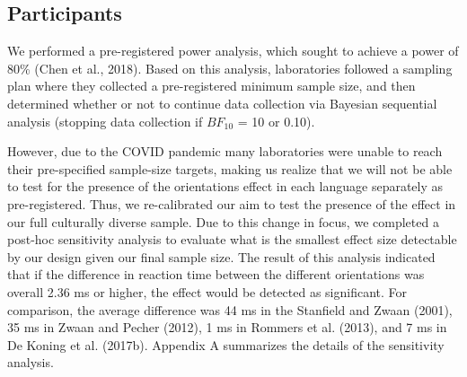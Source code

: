 \documentclass[
  man,mask,floatsintext]{apa7}
\begin{document}
\hypertarget{participants}{%
\subsection{Participants}\label{participants}}

We performed a pre-registered power analysis, which sought to achieve a
power of 80\% (Chen et al., 2018). Based on this analysis, laboratories followed
a sampling plan where they collected a pre-registered minimum sample
size, and then determined whether or not to continue data collection via
Bayesian sequential analysis (stopping data collection if \(BF_{10}\) = 10
or 0.10).

However, due to the COVID pandemic many laboratories were unable to
reach their pre-specified sample-size targets, making us realize that we
will not be able to test for the presence of the orientations effect in
each language separately as pre-registered. Thus, we re-calibrated our
aim to test the presence of the effect in our full culturally diverse
sample. Due to this change in focus, we completed a post-hoc sensitivity
analysis to evaluate what is the smallest effect size detectable by our
design given our final sample size. The result of this analysis
indicated that if the difference in reaction time between the different
orientations was overall 2.36 ms or higher, the effect would be detected
as significant. For comparison, the average difference was 44 ms in the
Stanfield and Zwaan (2001), 35 ms in Zwaan and Pecher (2012), 1
ms in Rommers et al. (2013), and 7 ms in
De Koning et al. (2017b). Appendix A summarizes the details of the
sensitivity analysis.
\end{document}
